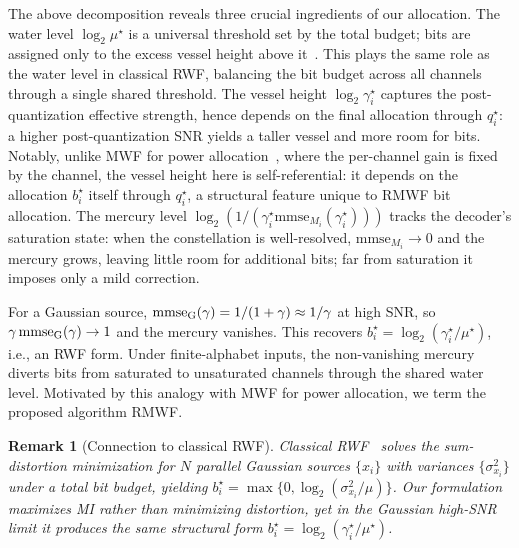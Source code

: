 \documentclass[10pt, twocolumn, comsoc]{IEEEtran}
\newtheorem{remark}{Remark}
\begin{document}
The above decomposition reveals three crucial ingredients of our allocation.
The water level $\log_2 \mu^\star$ is a universal threshold set by the total budget; bits are assigned only to the excess vessel height above it~\cite{CoverThomas}. 
This plays the same role as the water level in classical RWF, balancing the bit budget across all channels through a single shared threshold.
The vessel height $\log_2 \gamma_i^\star$ captures the post-quantization effective strength, hence depends on the final allocation through $q_i^\star$: a higher post-quantization SNR yields a taller vessel and more room for bits.
Notably, unlike MWF for power allocation~\cite{LozanoTulinoVerdu}, where the per-channel gain is fixed by the channel, the vessel height here is self-referential: it depends on the allocation $b_i^\star$ itself through $q_i^\star$, a structural feature unique to RMWF bit allocation.
The mercury level $\log_2(1/(\gamma_i^\star \mathrm{mmse}_{M_i}(\gamma_i^\star)))$ tracks the decoder's saturation state: when the constellation is well-resolved, $\mathrm{mmse}_{M_i} \to 0$ and the mercury grows, leaving little room for additional bits; far from saturation it imposes only a mild correction.

For a Gaussian source, $\mathrm{mmse}_{\rm G}(\gamma) = 1/(1+\gamma) \approx 1/\gamma$ at high SNR, so $\gamma\,\mathrm{mmse}_{\rm G}(\gamma) \to 1$ and the mercury vanishes. This recovers $b_i^\star = \log_2(\gamma_i^\star/\mu^\star)$, i.e., an RWF form. 
Under finite-alphabet inputs, the non-vanishing mercury diverts bits from saturated to unsaturated channels through the shared water level. Motivated by this analogy with MWF for power allocation, we term the proposed algorithm RMWF.


\begin{remark}[Connection to classical RWF]
\label{rem:classical_rwf}
\normalfont
Classical RWF~\cite{CoverThomas} solves the sum-distortion minimization for $N$ parallel Gaussian sources $\{x_i\}$ with variances $\{\sigma_{x_i}^2\}$ under a total bit budget, yielding $b_i^\star = \max\{0, \log_2(\sigma_{x_i}^2/\mu)\}$. Our formulation maximizes MI rather than minimizing distortion, yet in the Gaussian high-SNR limit it produces the same structural form $b_i^\star = \log_2(\gamma_i^\star/\mu^\star)$.
\end{remark}
\end{document}
